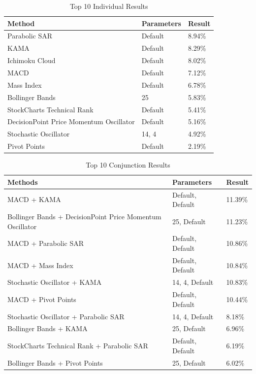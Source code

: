 \documentclass[conference]{IEEEtran}
\begin{document}
\begin{table}
\centering
\begin{tabu}{ |p{4cm}|p{4cm}|p{4cm}|}\hline\hline
Method & Parameters & Result \\ \hline
Parabolic SAR & Default & 8.94\% \\ \hline
KAMA & Default & 8.29\% \\ \hline
Ichimoku Cloud & Default & 8.02\% \\ \hline
MACD & Default & 7.12\% \\ \hline
Mass Index & Default & 6.78\% \\ \hline
Bollinger Bands & 25 & 5.83\% \\ \hline
StockCharts Technical Rank & Default & 5.41\% \\ \hline
DecisionPoint Price Momentum Oscillator & Default & 5.16\% \\ \hline
Stochastic Oscillator & 14, 4 & 4.92\% \\ \hline
Pivot Points & Default & 2.19\% \\ \hline
\end{tabu}
\vspace{2 mm}
\caption{Top 10 Individual Results}
\label{fig: Table Individual Results}
\end{table}

\begin{table}
\centering
\begin{tabu}{ |p{4cm}|p{4cm}|p{4cm}|}\hline\hline
Methods & Parameters & Result \\ \hline
MACD + KAMA & Default, Default & 11.39\% \\ \hline
Bollinger Bands + DecisionPoint Price Momentum Oscillator & 25, Default & 11.23\% \\ \hline
MACD + Parabolic SAR & Default, Default & 10.86\% \\ \hline
MACD + Mass Index & Default, Default & 10.84\% \\ \hline
Stochastic Oscillator + KAMA & 14, 4, Default & 10.83\% \\ \hline
MACD + Pivot Points & Default, Default & 10.44\% \\ \hline
Stochastic Oscillator + Parabolic SAR & 14, 4, Default & 8.18\% \\ \hline
Bollinger Bands + KAMA & 25, Default & 6.96\% \\ \hline
StockCharts Technical Rank + Parabolic SAR & Default, Default & 6.19\% \\ \hline
Bollinger Bands + Pivot Points & 25, Default &  6.02\%\\ \hline
\end{tabu}
\vspace{2 mm}
\caption{Top 10 Conjunction Results}
\label{fig: Table Conjunction Results}
\end{table}
\end{document}
